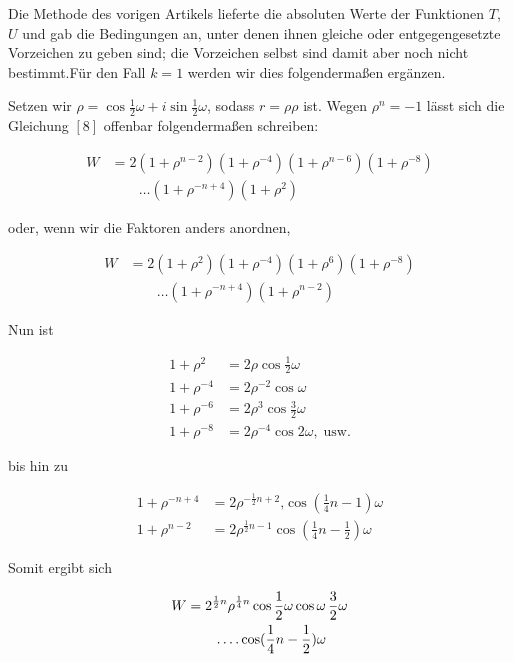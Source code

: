 
Die Methode des vorigen Artikels lieferte die absoluten Werte der Funktionen $T$, $U$ und gab die Bedingungen an, unter denen ihnen gleiche oder entgegengesetzte Vorzeichen zu geben sind; die Vorzeichen selbst sind damit aber noch nicht bestimmt.\quad Für den Fall $k=1$ werden wir dies folgendermaßen ergänzen.

Setzen wir $\rho=\cos\frac12\omega+i\sin\frac12\omega$, sodass $r=\rho\rho$ ist. Wegen $\rho^n=-1$ lässt sich die Gleichung $[8]$ offenbar folgendermaßen schreiben:

\[
\begin{aligned}
W&=2(1+\rho^{n-2})(1+\rho^{-4})(1+\rho^{n-6})(1+\rho^{-8})\\&\qquad\ldots(1+\rho^{-n+4})(1+\rho^2)
\end{aligned}
\]

oder, wenn wir die Faktoren anders anordnen,

\[
\begin{aligned}
W&=2(1+\rho^2)(1+\rho^{-4})(1+\rho^6)(1+\rho^{-8})\\&\qquad\ldots(1+\rho^{-n+4})(1+\rho^{n-2})
\end{aligned}
\]

Nun ist

\[
\begin{aligned}
1+\rho^2&=2\rho\cos\frac12\omega\\
1+\rho^{-4}&=2\rho^{-2}\cos\omega\\
1+\rho^{-6}&=2\rho^3\cos\frac32\omega\\
1+\rho^{-8}&=2\rho^{-4}\cos2\omega,\;\text{usw.}
\end{aligned}
\]

bis hin zu

\[
\begin{aligned}
1+\rho^{-n+4}&=2\rho^{-\frac12n+2}\mathord{,}\cos(\frac14n-1)\omega\\
1+\rho^{n-2}&=2\rho^{\frac12n-1}\cos(\frac14n-\frac12)\omega
\end{aligned}
\]

Somit ergibt sich


\[
\begin{aligned}
W&=2^{\frac12n}\rho^{\frac14n}\cos\frac12\omega\cos\omega\,\frac32\omega\\&\qquad\mathinner{.\,.\,.\,.}\cos(\frac14n-\frac12)\omega
\end{aligned}
\]

